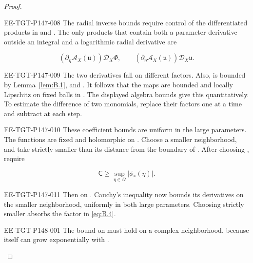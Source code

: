 \begin{proof}
\begin{EESegment}{EE-TGT-P147-008}
The radial inverse bounds require control of the differentiated products in
 and . The only products that contain both a
parameter derivative outside an integral and a logarithmic radial derivative are
\end{EESegment}
\begin{equation*}
  (\partial_\eta\mathcal A_X(\mathfrak u))\mathcal D_X\Phi,
  \qquad (\partial_\eta\mathcal A_X(\mathfrak u))\mathcal D_X\mathfrak u.
\end{equation*}
\begin{EESegment}{EE-TGT-P147-009}
The two derivatives fall on different factors. Also,
 is bounded by
Lemma~\ref{lem:B.1}, and . It follows that
the maps  are bounded and
locally Lipschitz on fixed balls in . The displayed algebra
bounds give this quantitatively. To estimate the difference of two monomials, replace their factors
one at a time and subtract at each step.
\end{EESegment}

\begin{EESegment}{EE-TGT-P147-010}
These coefficient bounds are uniform in the large parameters. The functions
 are fixed and holomorphic on
. Choose a smaller neighborhood, and take
 strictly smaller than its distance from the boundary of
. After choosing , require
\end{EESegment}
\begin{equation}
  \mathsf C\geq\sup_{\eta\in\Omega}|\phi_*(\eta)|.
  \tag{B.16}\label{eq:B.16}
\end{equation}
\begin{EESegment}{EE-TGT-P147-011}
Then  on . Cauchy's inequality now
bounds its derivatives on the smaller neighborhood, uniformly in both
large parameters. Choosing  strictly smaller absorbs the factor
 in \eqref{eq:B.4}.
\end{EESegment}
%
\begin{EESegment}{EE-TGT-P148-001}
The bound on  must hold on a complex neighborhood, because
 itself can grow exponentially with
.
\end{EESegment}


\end{proof}
